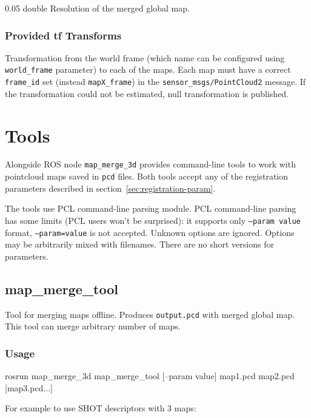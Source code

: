 {0.05}
{double}
{Resolution of the merged global map.}

\subsubsection{Provided tf Transforms}

{Transformation from the world frame (which name can be configured using \texttt{world\_frame} parameter) to each of the maps. Each map must have a correct \texttt{frame\_id} set (instead \texttt{mapX\_frame}) in the \texttt{sensor\_msgs/PointCloud2} message. If the transformation could not be estimated, null transformation is published.}

\section{Tools}

Alongside \gls{ROS} node \texttt{map\_merge\_3d} provides command-line tools to work with pointcloud maps saved in \texttt{pcd} files. Both tools accept any of the registration parameters described in section~\ref{sec:registration-param}.

The tools use \gls{PCL} command-line parsing module. \gls{PCL} command-line parsing has some limits (\gls{PCL} users won't be surprised): it supports only \texttt{--param value} format, \texttt{--param=value} is not accepted. Unknown options are ignored. Options may be arbitrarily mixed with filenames. There are no short versions for parameters.

\subsection{map\_merge\_tool}

Tool for merging maps offline. Produces \texttt{output.pcd} with merged global map. This tool can merge arbitrary number of maps.

\subsubsection{Usage}

\begin{code}
rosrun map_merge_3d map_merge_tool [--param value] map1.pcd
map2.pcd [map3.pcd...]
\end{code}

For example to use SHOT descriptors with 3 maps:

